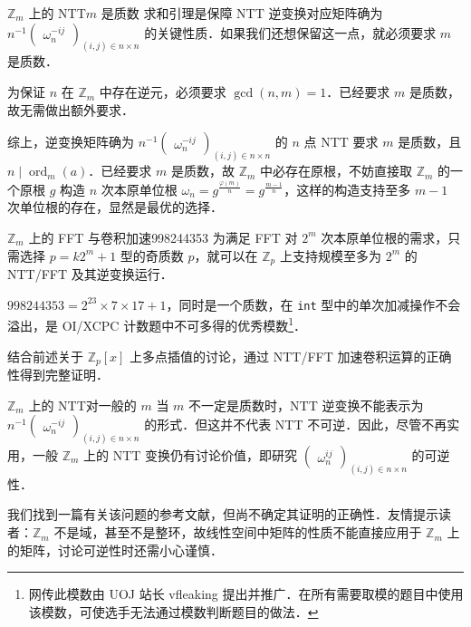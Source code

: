 \documentclass[fontset=fandol]{ctexbeamer}
\DeclareMathOperator{\ord}{ord}
\begin{document}
\begin{frame}{$\mathbb Z_m$ 上的 NTT}{$m$ 是质数}
    求和引理是保障 NTT 逆变换对应矩阵确为 $n^{-1} \begin{pmatrix} \omega_n^{-ij} \end{pmatrix}_{(i,j)\in n \times n}$ 的关键性质．如果我们还想保留这一点，就必须要求 $m$ 是质数．

    为保证 $n$ 在 $\mathbb Z_m$ 中存在逆元，必须要求 $\gcd(n,m)=1$．已经要求 $m$ 是质数，故无需做出额外要求．
    
    综上，\alert{逆变换矩阵确为 $n^{-1} \begin{pmatrix} \omega_n^{-ij} \end{pmatrix}_{(i,j)\in n \times n}$ 的 $n$ 点 NTT 要求 $m$ 是质数，且 $n \mid \ord_m(a)$}．已经要求 $m$ 是质数，故 $\mathbb Z_m$ 中必存在原根，不妨直接取 $\mathbb Z_m$ 的一个原根 $g$ 构造 $n$ 次本原单位根 $\omega_n = g^{\frac{\varphi(m)}{n}} = g^{\frac{m-1}{n}}$，这样的构造支持至多 $m-1$ 次单位根的存在，显然是最优的选择．
\end{frame}

\begin{frame}[fragile]{$\mathbb Z_m$ 上的 FFT 与卷积加速}{998244353}
    为满足 FFT 对 $2^m$ 次本原单位根的需求，只需选择 $p = k 2^m + 1$ 型的奇质数 $p$，就可以在 $\mathbb Z_p$ 上支持规模至多为 $2^m$ 的 NTT/FFT 及其逆变换运行．

    $998244353=2^{23} \times 7 \times 17 + 1$，同时是一个质数，在 \verb|int| 型中的单次加减操作不会溢出，是 OI/XCPC 计数题中不可多得的优秀模数\footnote{网传此模数由 UOJ 站长 vfleaking 提出并推广．在所有需要取模的题目中使用该模数，可使选手无法通过模数判断题目的做法．}．

    结合前述关于 $\mathbb Z_p[x]$ 上多点插值的讨论，通过 NTT/FFT 加速卷积运算的正确性得到完整证明．
\end{frame}

\begin{frame}{$\mathbb Z_m$ 上的 NTT}{对一般的 $m$}
    当 $m$ 不一定是质数时，NTT 逆变换不能表示为 $n^{-1} \begin{pmatrix} \omega_n^{-ij} \end{pmatrix}_{(i,j)\in n \times n}$ 的形式．但这并不代表 NTT 不可逆．因此，尽管不再实用，一般 $\mathbb Z_m$ 上的 NTT 变换仍有讨论价值，即研究 $\begin{pmatrix} \omega_n^{ij} \end{pmatrix}_{(i,j)\in n \times n}$ 的可逆性．

    我们找到一篇有关该问题的参考文献\cite[section 3 and appendix B]{agarwal1974fast}，但尚不确定其证明的正确性．友情提示读者：$\mathbb Z_m$ 不是域，甚至不是整环，故线性空间中矩阵的性质不能直接应用于 $\mathbb Z_m$ 上的矩阵，讨论可逆性时还需小心谨慎．
\end{frame}
\end{document}
